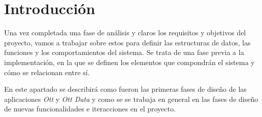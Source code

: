 \section{Introducción}
\label{subsec:Analisis_introduccion}

Una vez completada una fase de análisis y claros los requisitos y objetivos del proyecto, vamos a trabajar sobre 
estos para definir las estructuras de datos, las funciones y los comportamientos del sistema. Se trata de una
fase previa a la implementación, en la que se definen los elementos que compondrán el sistema y cómo se relacionan
entre sí. 

En este apartado se describirá como fueron las primeras fases de diseño de las aplicaciones \textit{Ott} y \textit{Ott Data} 
y como se se trabaja en general en las fases de diseño de nuevas funcionalidades e iteracciones en el proyecto.

